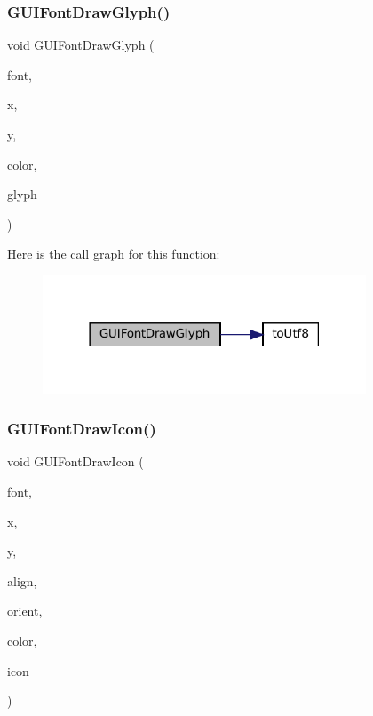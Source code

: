 \subsubsection{\texorpdfstring{G\+U\+I\+Font\+Draw\+Glyph()}{GUIFontDrawGlyph()}}
{\footnotesize\ttfamily void G\+U\+I\+Font\+Draw\+Glyph (\begin{DoxyParamCaption}\item[{const struct G\+U\+I\+Font $\ast$}]{font,  }\item[{\mbox{\hyperlink{ioapi_8h_a787fa3cf048117ba7123753c1e74fcd6}{int}}}]{x,  }\item[{\mbox{\hyperlink{ioapi_8h_a787fa3cf048117ba7123753c1e74fcd6}{int}}}]{y,  }\item[{uint32\+\_\+t}]{color,  }\item[{uint32\+\_\+t}]{glyph }\end{DoxyParamCaption})}

Here is the call graph for this function\+:
\nopagebreak
\begin{figure}[H]
\begin{center}
\leavevmode
\includegraphics[width=273pt]{psp2_2gui-font_8c_a7be283f1f320dc6308f9bc4ac24c4da7_cgraph}
\end{center}
\end{figure}
\mbox{\label{psp2_2gui-font_8c_a89adf10a0ec4d3b2dfba92b95ab17ad5}} 
\subsubsection{\texorpdfstring{G\+U\+I\+Font\+Draw\+Icon()}{GUIFontDrawIcon()}}
{\footnotesize\ttfamily void G\+U\+I\+Font\+Draw\+Icon (\begin{DoxyParamCaption}\item[{const struct G\+U\+I\+Font $\ast$}]{font,  }\item[{\mbox{\hyperlink{ioapi_8h_a787fa3cf048117ba7123753c1e74fcd6}{int}}}]{x,  }\item[{\mbox{\hyperlink{ioapi_8h_a787fa3cf048117ba7123753c1e74fcd6}{int}}}]{y,  }\item[{enum G\+U\+I\+Alignment}]{align,  }\item[{enum G\+U\+I\+Orientation}]{orient,  }\item[{uint32\+\_\+t}]{color,  }\item[{enum G\+U\+I\+Icon}]{icon }\end{DoxyParamCaption})}

